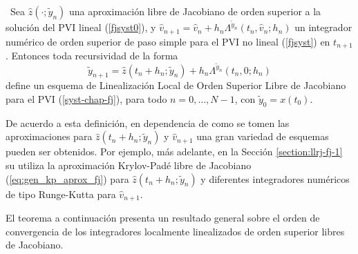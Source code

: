 \begin{definition}\label{definition:holl-fj}
\cite{naranjo2023jacobian}~Sea $\hat{z}(\cdot;\widetilde{y}_n)$ una aproximación libre de Jacobiano de orden superior a la solución del PVI lineal (\ref{fjsyst0}), y $\widehat{v}_ {n+1}=\widehat{v}_n+h_n\Lambda^{\widetilde{y}_n}(t_n,\widehat{v}_n;h_n)$ un integrador numérico de orden superior de paso simple para el PVI no lineal (\ref{fjsyst}) en $t_{n+1}$. Entonces toda recursividad de la forma
\begin{equation*}
    \widetilde{y}_{n+1}= \hat{z}(t_n+h_n;\widetilde{y}_n)+h_n\Lambda^{\widetilde{y}_n}(t_n,0;h_n)
\end{equation*}
define un esquema de Linealización Local de Orden Superior Libre de Jacobiano para el PVI (\ref{syst-chap-fj}), para todo $n=0,\ldots,N-1$, con $\widetilde{y}_0=x(t_0)$.
\end{definition}

De acuerdo a esta definición, en dependencia de como se tomen las aproximaciones para $\hat{z}(t_n+h_n;\widetilde{y}_n)$ y $\widehat{v}_{n+1}$ una gran variedad de esquemas pueden ser obtenidos. Por ejemplo, más adelante, en la Sección \ref{section:llrj-fj-1} su utiliza la aproximación Krylov-Padé libre de Jacobiano (\ref{eq:gen_kp_aprox_fj}) para $\hat{z}(t_n+h_n;\widetilde{y}_n)$ y diferentes integradores numéricos de tipo Runge-Kutta para $\widehat{v}_{n+1}$.

El teorema a continuación presenta un resultado general sobre el orden de convergencia de los integradores localmente linealizados de orden superior libres de Jacobiano.

